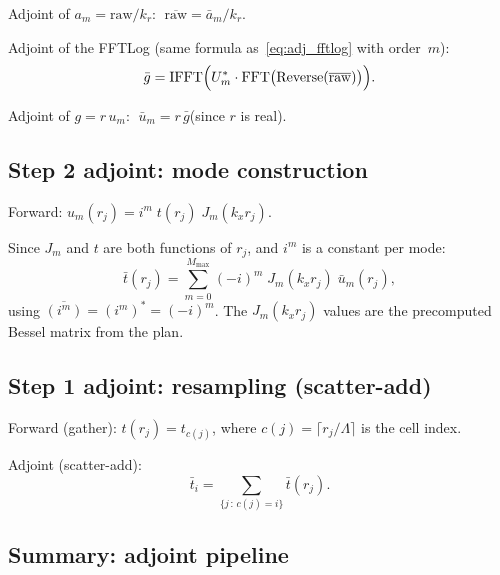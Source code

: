 \documentclass[11pt,a4paper]{article}
\begin{document}
Adjoint of $a_m = \mathrm{raw}/k_r$: $\;\overline{\mathrm{raw}} = \bar a_m / k_r$.

Adjoint of the FFTLog (same formula as~\eqref{eq:adj_fftlog} with order~$m$):
\begin{equation}
  \bar g = \mathrm{IFFT}\Bigl(U_m^*\cdot\mathrm{FFT}\bigl(
    \mathrm{Reverse}(\overline{\mathrm{raw}})\bigr)\Bigr).
\end{equation}

Adjoint of $g = r\,u_m$: $\;\bar u_m = r\,\bar g$\quad(since $r$ is real).


\subsection{Step 2 adjoint: mode construction}

Forward: $u_m(r_j) = i^m\;t(r_j)\;J_m(k_x r_j)$.

Since $J_m$ and $t$ are both functions of $r_j$, and $i^m$ is a constant per mode:
\begin{equation}\label{eq:adj_modes}
  \bar t(r_j) = \sum_{m=0}^{M_{\max}} (-i)^m\;J_m(k_x r_j)\;\bar u_m(r_j),
\end{equation}
using $\overline{(i^m)} = (i^m)^* = (-i)^m$.
The $J_m(k_x r_j)$ values are the precomputed Bessel matrix from the plan.


\subsection{Step 1 adjoint: resampling (scatter-add)}

Forward (gather): $t(r_j) = t_{c(j)}$, where $c(j) = \lceil r_j/\Lambda\rceil$
is the cell index.

Adjoint (scatter-add):
\begin{equation}\label{eq:adj_resample}
  \bar t_i = \sum_{\{j\,:\,c(j)=i\}} \bar t(r_j).
\end{equation}


\subsection{Summary: adjoint pipeline}
\end{document}

